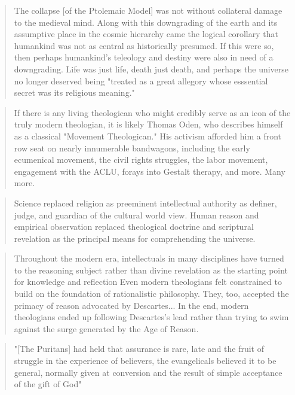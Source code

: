 \begin{quote}
  The collapse [of the Ptolemaic Model] was not without collateral damage to the medieval mind. Along with this downgrading of the earth and its assumptive place in the cosmic hierarchy came the logical corollary that humankind was not as central as historically presumed. If this were so, then perhaps humankind's teleology and destiny were also in need of a downgrading. Life was just life, death just death, and perhaps the universe no longer deserved being "treated as a great allegory whose esssential secret was its religious meaning."
\end{quote}

\begin{quote}
  If there is any living theologican who might credibly serve as an icon of the truly modern theologian, it is likely Thomas Oden, who describes himself as a classical "Movement Theologican." His activism afforded him a front row seat on nearly innumerable bandwagons, including the early ecumenical movement, the civil rights struggles, the labor movement, engagement with the ACLU, forays into Gestalt therapy, and more. Many more.
\end{quote}

\begin{quote}
  Science replaced religion as preeminent intellectual authority as definer, judge, and guardian of the cultural world view. Human reason and empirical observation replaced theological doctrine and scriptural revelation as the principal means for comprehending the universe.
\end{quote}

\begin{quote}
  Throughout the modern era, intellectuals in many disciplines have turned to the reasoning subject rather than divine revelation as the starting point for knowledge and reflection Even modern theologians felt constrained to build on the foundation of rationalistic philosophy. They, too, accepted the primacy of reason advocated by Descartes... In the end, modern theologians ended up following Descartes's lead rather than trying to swim against the surge generated by the Age of Reason.
\end{quote}

\begin{quote}
  "[The Puritans] had held that assurance is rare, late and the fruit of struggle in the experience of believers, the evangelicals believed it to be general, normally given at conversion and the result of simple acceptance of the gift of God"
\end{quote}

